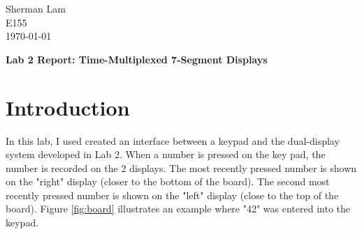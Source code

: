 \documentclass[11pt]{article}
\begin{document}
\begin{flushleft}
Sherman Lam
\\E155
\\ \today
\end{flushleft}


\begin{center}
\begin{Large}
\textbf{Lab 2 Report: Time-Multiplexed 7-Segment Displays}
\end{Large}
\end{center}




\section{Introduction}
\label{sec:intro}

In this lab, I used created an interface between a keypad and the dual-display system developed in Lab 2. When a number is pressed on the key pad, the number is recorded on the 2 displays. The most recently pressed number is shown on the "right" display (closer to the bottom of the board). The second most recently pressed number is shown on the "left" display (close to the top of the board). Figure \ref{fig:board} illustrates an example where "42" was entered into the keypad.
\end{document}
